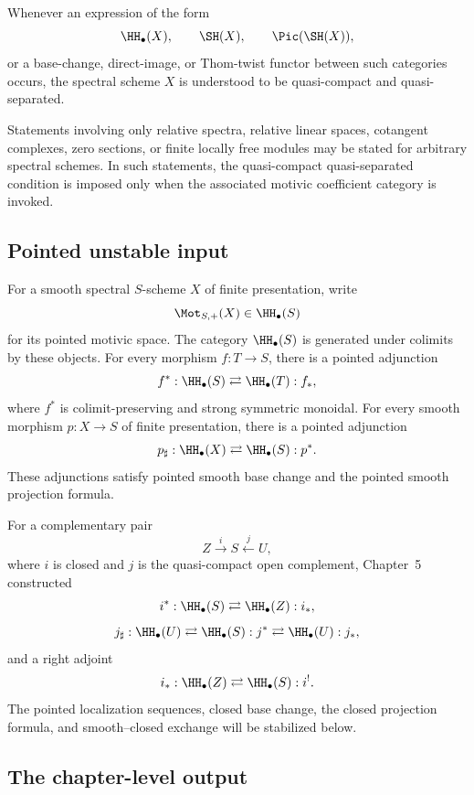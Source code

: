 \begin{convention}
\label{conv:stable-coefficient-scope}
Whenever an expression of the form
\[
    \HH_\bullet(X),
    \qquad
    \SH(X),
    \qquad
    \Pic(\SH(X)),
\]
or a base-change, direct-image, or Thom-twist functor between such categories
occurs, the spectral scheme \(X\) is understood to be quasi-compact and
quasi-separated.

Statements involving only relative spectra, relative linear spaces,
cotangent complexes, zero sections, or finite locally free modules may be
stated for arbitrary spectral schemes.  In such statements, the
quasi-compact quasi-separated condition is imposed only when the associated
motivic coefficient category is invoked.
\end{convention}

\subsection{Pointed unstable input}

For a smooth spectral $S$-scheme $X$ of finite presentation, write
\[
    \Mot_{S,+}(X)
    \in
    \HH_\bullet(S)
\]
for its pointed motivic space.  The category $\HH_\bullet(S)$ is generated under colimits by these
objects.  For every morphism $f:T\to S$, there is a pointed adjunction
\[
    f^*:\HH_\bullet(S)
    \rightleftarrows
    \HH_\bullet(T):f_*,
\]
where $f^*$ is colimit-preserving and strong symmetric monoidal.  For every smooth morphism
$p:X\to S$ of finite presentation, there is a pointed adjunction
\[
    p_\sharp:\HH_\bullet(X)
    \rightleftarrows
    \HH_\bullet(S):p^*.
\]
These adjunctions satisfy pointed smooth base change and the pointed smooth projection formula.

For a complementary pair
\[
    Z\xrightarrow{i}S\xleftarrow{j}U,
\]
where $i$ is closed and $j$ is the quasi-compact open complement, Chapter~5 constructed
\[
    i^*:\HH_\bullet(S)
    \rightleftarrows
    \HH_\bullet(Z):i_*,
\]
\[
    j_\sharp:\HH_\bullet(U)
    \rightleftarrows
    \HH_\bullet(S):j^*
    \rightleftarrows
    \HH_\bullet(U):j_*,
\]
and a right adjoint
\[
    i_*:\HH_\bullet(Z)
    \rightleftarrows
    \HH_\bullet(S):i^!.
\]
The pointed localization sequences, closed base change, the closed projection formula, and
smooth--closed exchange will be stabilized below.

\subsection{The chapter-level output}

